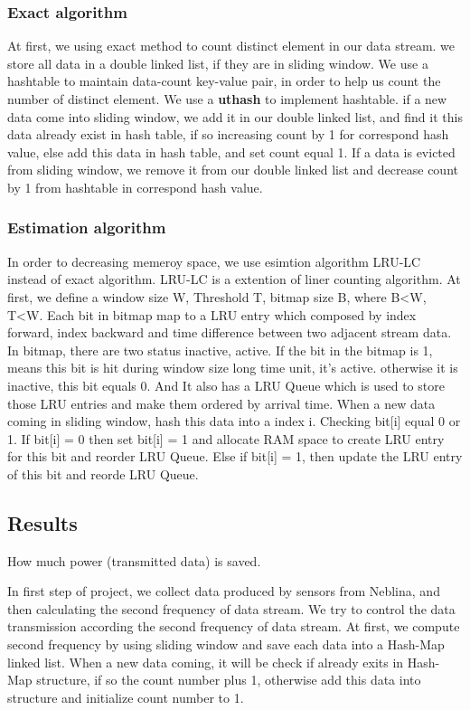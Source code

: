 \documentclass{report}
\begin{document}
\subsubsection{Exact algorithm}
At first, we using exact method to count distinct element in our data stream. we store all data in a double linked list, if they are in sliding window. We use a hashtable to maintain data-count key-value pair, in order to help us count the number of distinct element. We use a \textbf{uthash} to implement hashtable. if a new data come into sliding window, we add it in our double linked list, and find it this data already exist in hash table, if so increasing count by 1 for correspond hash value, else add this data in hash table, and set count equal 1. If a data is evicted from sliding window, we remove it from our double linked list and decrease count by 1 from hashtable in correspond hash value.

\subsubsection{Estimation algorithm}
In order to decreasing memeroy space, we use esimtion algorithm LRU-LC instead of exact algorithm. LRU-LC is a extention of liner counting algorithm. At first, we define a window size W, Threshold T, bitmap size B, where B<W, T<W.  Each bit in bitmap map to a LRU entry which composed by index forward, index backward and time difference between two adjacent stream data. In bitmap, there are two status inactive, active.
If the bit in the bitmap is 1, means this bit is hit during window size long time unit, it’s active. otherwise it is inactive, this bit equals 0. And It also has a LRU Queue which is used to store those LRU entries and make them ordered by arrival time.
When a new data coming in sliding window, hash this data into a index i. Checking bit[i] equal 0 or 1. If bit[i] = 0 then set bit[i] = 1 and allocate RAM space to create LRU entry for this bit and reorder LRU Queue. Else if bit[i] = 1, then update the LRU entry of this bit and reorde LRU Queue.

\subsection{Results}

How much power (transmitted data) is saved.



In first step of project, we collect data produced by sensors from Neblina, and then calculating the second frequency of data stream.
We try to control the data transmission according the second frequency of data stream. At first, we compute second frequency by using sliding window and save each data into a Hash-Map linked list. When a new data coming, it will be check if already exits in Hash-Map structure, if so the count number plus 1, otherwise add this data into structure and initialize count number to 1.





\end{document}
